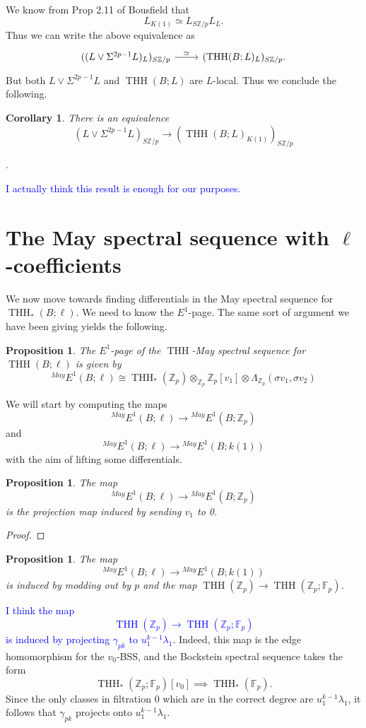 \documentclass[12pt]{amsart}
\newcommand{\Z}{\mathbb{Z}}
\newcommand{\F}{\mathbb{F}}
\DeclareMathOperator{\THH}{THH}
\newcommand{\MayE}{\mbox{}^{May}E}
\newtheorem{cor}[equation]{Corollary}
\newtheorem{prop}[equation]{Proposition}
\theoremstyle{definition}
\numberwithin{equation}{section}
\numberwithin{figure}{section}
\begin{document}
We know from Prop 2.11 of Bousfield that
\[
L_{K(1)}\simeq L_{S\Z/p}L_{L}.
\]
Thus we can write the above equivalence as 
\[
\begin{tikzcd}
((L\vee \Sigma^{2p-1}L)_{L})_{S\Z/p}\arrow[r, "\simeq"] & (\THH(B;L)_L)_{S\Z/p}.
\end{tikzcd}
\]
But both $L\vee \Sigma^{2p-1}L$ and $\THH(B;L)$ are $L$-local. Thus we conclude the following. 

\begin{cor}
	There is an equivalence
	\[
	(L\vee \Sigma^{2p-1}L)_{S\Z/p}\to (\THH(B;L)_{K(1)})_{S\Z/p}
	\]
\end{cor}.

\textcolor{blue}{I actually think this result is enough for our purposes.}


\section{The May spectral sequence with $\ell$-coefficients}

We now move towards finding differentials in the May spectral sequence for $\THH_*(B;\ell)$. We need to know the $E^1$-page. The same sort of argument we have been giving yields the following. 

\begin{prop}
	The $E^1$-page of the $\THH$-May spectral sequence for $\THH(B;\ell)$ is given by 
	\[
	\MayE^1(B;\ell)\cong \THH_*(\Z_p)\otimes_{\Z_p}\Z_p[v_1]\otimes \Lambda_{\Z_p}(\sigma v_1, \sigma v_2)
	\]
\end{prop}

We will start by computing the maps 
\[
\MayE^1(B; \ell)\to \MayE^1(B; \Z_p)
\]
and 
\[
\MayE^1(B;\ell)\to \MayE^1(B;k(1))
\]
with the aim of lifting some differentials. 

\begin{prop}
	The map 
	\[
	\MayE^1(B;\ell)\to \MayE^1(B;\Z_p)
	\]
	is the projection map induced by sending $v_1$ to 0. 
\end{prop}
\begin{proof}
\end{proof}

\begin{prop}
	The map 
	\[
	\MayE^1(B;\ell)\to \MayE^1(B;k(1))
	\]
	is induced by modding out by $p$ and the map $\THH(\Z_p)\to \THH(\Z_p;\F_p)$. 
\end{prop}

\textcolor{blue}{I think the map 
\[
\THH(\Z_p)\to \THH(\Z_p;\F_p)
\]
is induced by projecting $\gamma_{pk}$ to $u_1^{k-1}\lambda_1$}. Indeed, this map is the edge homomorphism for the $v_0$-BSS, and the Bockstein spectral sequence takes the form 
\[
\THH_*(\Z_p;\F_p)[v_0]\implies \THH_*(\F_p).
\]
Since the only classes in filtration 0 which are in the correct degree are $u_1^{k-1}\lambda_1$, it follows that $\gamma_{pk}$ projects onto $u_1^{k-1}\lambda_1$. 
\end{document}
